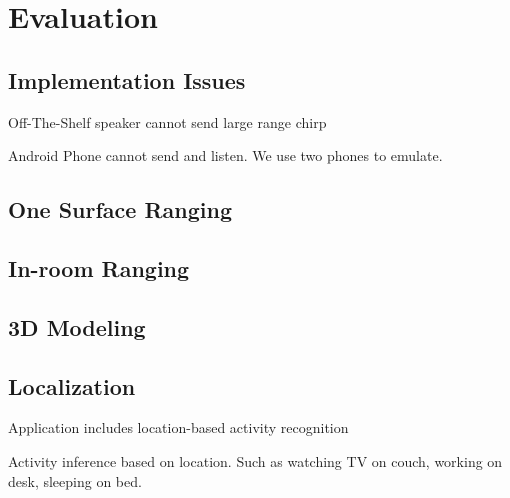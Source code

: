 \section{Evaluation}
\label{sec:eval}

\subsection{Implementation Issues}

Off-The-Shelf speaker cannot send large range chirp


Android Phone cannot send and listen. We use two phones to emulate.



\subsection{One Surface Ranging}


\subsection{In-room Ranging}



\subsection{3D Modeling}




\subsection{Localization}

Application includes location-based activity recognition

Activity inference based on location. Such as watching TV on couch, working on desk, sleeping on bed.